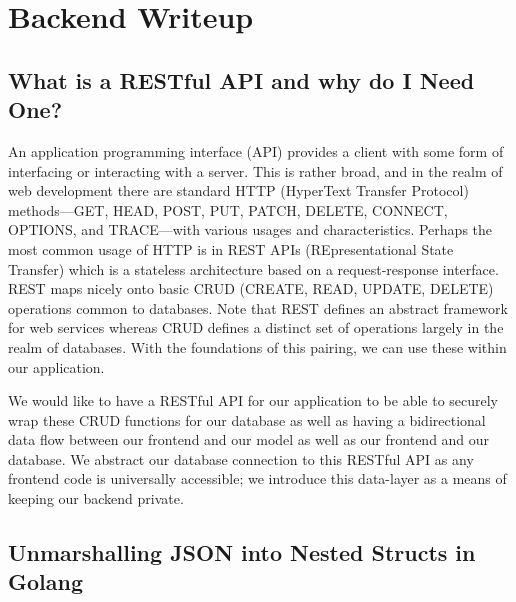 \documentclass[11pt, twoside, reqno]{book}
\begin{document}
\startmain
\chapter{Backend Writeup}

\section{What is a RESTful API and why do I Need One?}

An application programming interface (API) provides a client with some form of interfacing or interacting with a server. This is rather broad, and in the realm of web development there are standard HTTP (HyperText Transfer Protocol) methods—GET, HEAD, POST, PUT, PATCH, DELETE, CONNECT, OPTIONS, and TRACE—with various usages and characteristics. Perhaps the most common usage of HTTP is in REST APIs (REpresentational State Transfer) which is a stateless architecture based on a request-response interface. REST maps nicely onto basic CRUD (CREATE, READ, UPDATE, DELETE) operations common to databases. Note that REST defines an abstract framework for web services whereas CRUD defines a distinct set of operations largely in the realm of databases. With the foundations of this pairing, we can use these within our application.

We would like to have a RESTful API for our application to be able to securely wrap these CRUD functions for our database as well as having a bidirectional data flow between our frontend and our model as well as our frontend and our database. We abstract our database connection to this RESTful API as any frontend code is universally accessible; we introduce this data-layer as a means of keeping our backend private.




\section{Unmarshalling JSON into Nested Structs in Golang}
\end{document}
